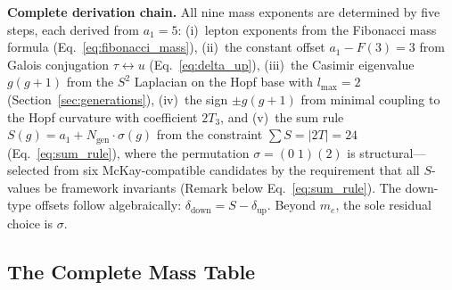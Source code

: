 \documentclass[12pt,a4paper]{article}
\theoremstyle{definition}
\begin{document}
\textbf{Complete derivation chain.} All nine mass exponents are determined by five steps, each derived from $a_1 = 5$: (i)~lepton exponents from the Fibonacci mass formula (Eq.~\eqref{eq:fibonacci_mass}), (ii)~the constant offset $a_1 - F(3) = 3$ from Galois conjugation $\tau \leftrightarrow u$ (Eq.~\eqref{eq:delta_up}), (iii)~the Casimir eigenvalue $g(g+1)$ from the $S^2$ Laplacian on the Hopf base with $l_{\max} = 2$ (Section~\ref{sec:generations}), (iv)~the sign $\pm g(g+1)$ from minimal coupling to the Hopf curvature with coefficient $2T_3$, and (v)~the sum rule $S(g) = a_1 + N_{\text{gen}} \cdot \sigma(g)$ from the constraint $\sum S = |2T| = 24$ (Eq.~\eqref{eq:sum_rule}), where the permutation $\sigma = (0\;1)(2)$ is structural---selected from six McKay-compatible candidates by the requirement that all $S$-values be framework invariants (Remark below Eq.~\eqref{eq:sum_rule}). The down-type offsets follow algebraically: $\delta_{\text{down}} = S - \delta_{\text{up}}$. Beyond $m_e$, the sole residual choice is $\sigma$.

\subsection{The Complete Mass Table}
\end{document}
